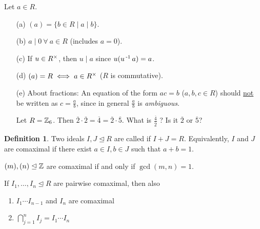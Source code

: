 \documentclass[11pt]{book}
\theoremstyle{definition}   \newtheorem{defn}[counter]{Definition} %
\newcommand{\ov}{\overline}   \newcommand{\wt}{\widetilde}
\newcommand{\nsg}{\mathrel{\unlhd}}   \newcommand{\ind}{\parindent24pt}   \newcommand{\vn}{\varnothing}
\newcommand{\vs}{\vspace{8pt}}
\numberwithin{counter}{chapter}
\begin{document}
\begin{remark}
Let $a \in R$.
\begin{enumerate}
\item[(a)] $(a) = \{b \in R \mid a \mid b\}$.
\item[(b)] $a \mid 0 \ \forall \ a \in R$ (includes $a = 0$).
\item[(c)] If $u \in R^{\times}$, then $u \mid a$ since $u(u\operatorname{^{-1}} a) = a$.
\item[(d)] $(a) = R \iff a \in R^{\times}$ ($R$ is commutative).
\item[(e)] About fractions: An equation of the form $ac = b$ ($a,b,c \in R$) should \underline{not} be written as $c = \frac{a}{b}$, since in general $\frac{a}{b}$ is \emph{ambiguous}.
\begin{example*}
Let $R = \operatorname{\mathbb{Z}}_6$. Then $\ov{2} \cdot \ov{2} = \ov{4} = \ov{2} \cdot \ov{5}$. What is $\frac{\ov{4}}{\ov{2}}$ ? Is it $\ov{2}$ or $\ov{5}$?
\end{example*}
\end{enumerate}
\end{remark}

\vs

\begin{defn}
Two ideals $I,J \nsg R$ are called  if $I+J = R$. Equivalently, $I$ and $J$ are comaximal if there exist $a \in I, b \in J$ such that $a+b = 1$.
\end{defn}

\vs

\begin{example*}
$(m), (n) \nsg \z$ are comaximal if and only if $\gcd(m,n) = 1$.
\end{example*}

\vs

\begin{lemma}
	If $I_1, \dots, I_n \nsg R$ are pairwise comaximal, then also
	\begin{enumerate}
		\item $I_1 \cdots I_{n-1}$ and $I_n$ are comaximal
		\item \(\bigcap_{j=1}^n I_j = I_1 \cdots I_n \)
	\end{enumerate}
\end{lemma}
\end{document}

